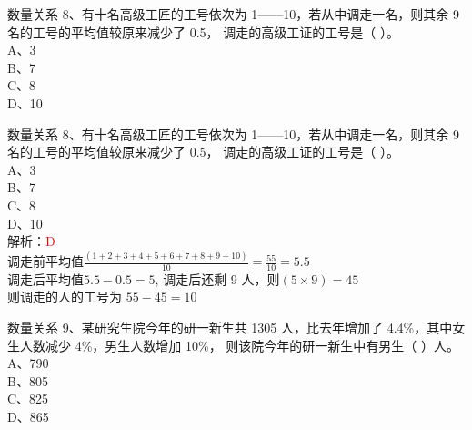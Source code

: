 \documentclass[aspectratio=169]{beamer}
\begin{document}
\begin{frame}[t]{数量关系}
    8、有十名高级工匠的工号依次为 1——10，若从中调走一名，则其余 9 名的工号的平均值较原来减少了 0.5，
    调走的高级工证的工号是（ ）。\\
    A、3\\
    B、7\\
    C、8\\
    D、10\\
\end{frame}



\begin{frame}[t]{数量关系}
    8、有十名高级工匠的工号依次为 1——10，若从中调走一名，则其余 9 名的工号的平均值较原来减少了 0.5，
    调走的高级工证的工号是（ ）。\\
    A、3\\
    B、7\\
    C、8\\
    D、10\\
    解析：\textcolor{red}{D}\\
    调走前平均值$\frac{(1+2+3+4+5+6+7+8+9+10)}{10} = \frac{55}{10} = 5.5$\\
    调走后平均值$5.5 - 0.5 = 5$, 调走后还剩 9 人，则$(5\times9) = 45$\\
    则调走的人的工号为 $55-45=10$\\
\end{frame}


\begin{frame}[t]{数量关系}
    9、某研究生院今年的研一新生共 1305 人，比去年增加了 4.4\%，其中女生人数减少 4\%，男生人数增加 10\%，
    则该院今年的研一新生中有男生（ ）人。\\
    A、790\\
    B、805\\
    C、825\\
    D、865\\
\end{frame}
\end{document}
